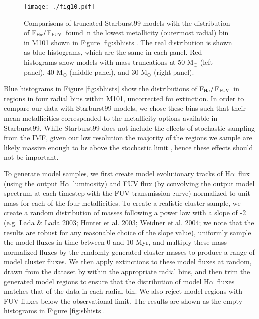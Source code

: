 \documentclass[iop]{emulateapj}
\newcommand{\ha}{H$\alpha$}
\newcommand{\hafuv}{F$_{\rm H\alpha}/$F$_{\rm FUV}$}
\begin{document}
\begin{figure*}
  \centering
  \texttt{[image: ./fig10.pdf]}
  \caption{Comparisons of truncated Starburst99 models with the
      distribution of \hafuv \ found in the lowest metallicity
      (outermost radial) bin in M101 shown in Figure
      \ref{fig:sbhists}.  The real distribution is shown as blue
      histograms, which are the same in each panel.  Red histograms
      show models with mass truncations at 50 M$_{\odot}$ (left
      panel), 40 M$_{\odot}$ (middle panel), and 30 M$_{\odot}$ (right
      panel).  \label{fig:sb99trunc}}
\end{figure*}

Blue histograms in Figure \ref{fig:sbhists} show the distributions of
\hafuv \ in  regions in four radial bins within M101,
uncorrected for extinction.  In order to compare our data with
Starburst99 models, we chose these bins such that their mean
metallicities \citep[measured from the  region metallicity
  values supplied by][which range from $\sim$5$\times$ solar to $\sim
  1/5$ solar]{scowen92} corresponded to the metallicity options
available in Starburst99.  While Starburst99 does not include the
  effects of stochastic sampling from the IMF, given our low
  resolution the majority of the regions we sample are likely massive
  enough to be above the stochastic limit \citep[at M101, below
    $\log($F$_{\rm H\alpha}) \sim$ -15, e.g.][]{hermanowicz13}, hence
  these effects should not be important.

To generate model samples, we first create model evolutionary tracks
of \ha \ flux (using the output \ha \ luminosity) and FUV flux (by
convolving the output model spectrum at each timestep with the FUV
transmission curve) normalized to unit mass for each of the four
metallicities.  To create a realistic cluster sample, we create a
random distribution of masses following a power law with a slope of -2
(e.g. Lada \& Lada 2003; Hunter et al. 2003; Weidner et al. 2004; we
note that the results are robust for any reasonable choice of the
slope value), uniformly sample the model fluxes in time between 0 and
10 Myr, and multiply these mass-normalized fluxes by the randomly
generated cluster masses to produce a range of model cluster fluxes.
We then apply extinctions to these model fluxes at random, drawn from
the dataset by \citet{scowen92} within the appropriate radial bins,
and then trim the generated model regions to ensure that the
distribution of model \ha \ fluxes matches that of the data in each
radial bin.  We also reject model regions with FUV fluxes below the
observational limit.  The results are shown as the empty histograms in
Figure \ref{fig:sbhists}.
\end{document}
